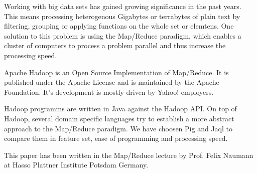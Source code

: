 Working with big data sets has gained growing significance in the past years. This means processing heterogenous Gigabytes or terrabytes of plain text by filtering, grouping or applying functions on the whole set or elemtens. One solution to this problem is using the Map/Reduce paradigm, which enables a cluster of computers to process a problem parallel and thus increase the processing speed.

Apache Hadoop is an Open Source Implementation of Map/Reduce. It is published under the Apache License and is maintained by the Apache Foundation. It's development is mostly driven by Yahoo! employers.

Hadoop programms are written in Java against the Hadoop API. On top of Hadoop, several domain specific languages try to establish a more abstract approach to the Map/Reduce paradigm. We have choosen Pig and Jaql to compare them in feature set, ease of programming and processing speed.

This paper has been written in the Map/Reduce lecture by Prof. Felix Naumann at Hasso Plattner Institute Potsdam Germany.